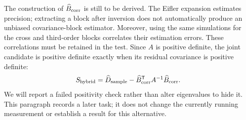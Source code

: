 The construction of $\widehat B_{\rm corr}$ is still to be derived. The
Eifler expansion estimates precision; extracting a block after inversion
does not automatically produce an unbiased covariance-block estimator.
Moreover, using the same simulations for the cross and third-order blocks
correlates their estimation errors. These correlations must be retained
in the test. Since $A$ is positive definite, the joint candidate is positive
definite exactly when its residual covariance is positive definite:
\begin{equation}
 S_{\rm hybrid}=\widehat D_{\rm sample}
 -\widehat B_{\rm corr}^{\mathsf T}A^{-1}\widehat B_{\rm corr}.
\end{equation}
We will report a failed positivity check rather than alter eigenvalues to
hide it. This paragraph records a later task; it does not change the
currently running measurement or establish a result for this alternative.
